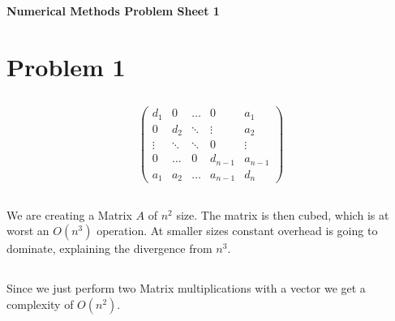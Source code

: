 \newcommand{\doctitle}{Numerical Methods Problem Sheet 1}



\begin{center}{\bfseries\Huge\doctitle}\end{center}

\section{Problem 1}
\subsection{}

$$ \left(\begin{array}{ccccc}
     d_1 & 0 & \hdots & 0 & a_1 \\
     0 & d_2 & \ddots & \vdots & a_2 \\
     \vdots & \ddots & \ddots & 0 & \vdots \\
     0 & \hdots & 0 & d_{n-1} & a_{n-1} \\
     a_1 & a_2 & \hdots & a_{n-1} & d_n
\end{array}\right) $$

\subsection{}

We are creating a Matrix $A$ of $n^2$ size. The matrix is then cubed, which is at worst an $O(n^3)$ operation. At smaller sizes constant overhead is going to dominate, explaining the divergence from $n^3$.

\subsection{}


\subsection{}

Since we just perform two Matrix multiplications with a vector we get a complexity of $O(n^2)$.

\subsection{}

